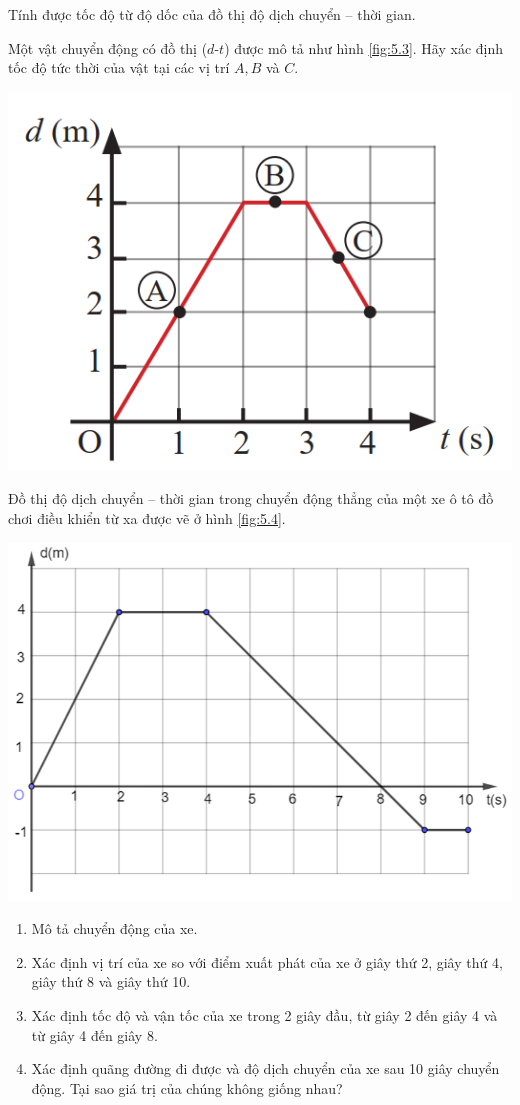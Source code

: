 \begin{dang}{Tính được tốc độ từ độ dốc của đồ thị độ dịch chuyển – thời gian.}
	{Một vật chuyển động có đồ thị ($d$-$t$) được mô tả như hình \ref{fig:5.3}. Hãy xác định tốc độ tức thời của vật tại các vị trí $A, B$ và $C$.
		\begin{center}
			\includegraphics[width=0.35\linewidth]{../figs/VN10-2023-PH-TP005-3}
			\label{fig:5.3}
		\end{center}
	}
	{}

{Đồ thị độ dịch chuyển – thời gian trong chuyển động thẳng của một xe ô tô đồ chơi điều khiển từ xa được vẽ ở hình \ref{fig:5.4}.
	\begin{center}
		\includegraphics[width=0.5\linewidth]{../figs/VN10-2023-PH-TP005-4}
		\label{fig:5.4}
	\end{center}
	\begin{enumerate}[label=\alph*)]
		\item Mô tả chuyển động của xe.
		\item Xác định vị trí của xe so với điểm xuất phát của xe ở giây thứ 2, giây thứ 4, giây thứ 8 và giây thứ 10.
		\item Xác định tốc độ và vận tốc của xe trong 2 giây đầu, từ giây 2 đến giây 4 và từ giây 4 đến giây 8.
		\item Xác định quãng đường đi được và độ dịch chuyển của xe sau 10 giây chuyển động. Tại sao giá trị của chúng không giống nhau?
	\end{enumerate}
	
}
\end{dang}
